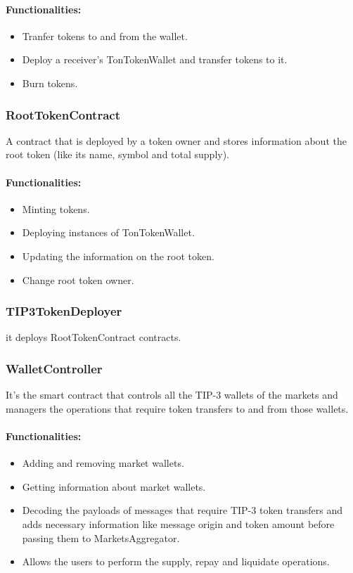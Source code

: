 \paragraph*{Functionalities:}
\begin{itemize}
  \item Tranfer tokens to and from the wallet.
  \item Deploy a receiver's TonTokenWallet and transfer tokens to it.
  \item Burn tokens.
\end{itemize}

\subsubsection{RootTokenContract}

A contract that is deployed by a token owner and stores information about the root token (like its name, symbol and total supply).

\paragraph*{Functionalities:}
\begin{itemize}
  \item Minting tokens.
  \item Deploying instances of TonTokenWallet.
  \item Updating the information on the root token.
  \item Change root token owner.
\end{itemize}

\subsubsection{TIP3TokenDeployer}

it deploys RootTokenContract contracts.

\subsubsection{WalletController}

It's the smart contract that controls all the TIP-3 wallets of the markets and managers the operations that require token transfers to and from those wallets.

\paragraph*{Functionalities:}
\begin{itemize}
  \item Adding and removing market wallets.
  \item Getting information about market wallets.
  \item Decoding the payloads of messages that require TIP-3 token transfers and adds necessary information like message origin and token amount before passing them to MarketsAggregator.
  \item Allows the users to perform the supply, repay and liquidate operations.
\end{itemize}

